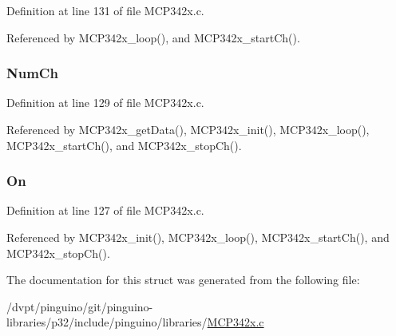 Definition at line 131 of file M\-C\-P342x.\-c.



Referenced by M\-C\-P342x\-\_\-loop(), and M\-C\-P342x\-\_\-start\-Ch().

\hypertarget{structtag_m_c_p342x_a0205dd711b1cc7c32042fe54634bfe84}{
\subsubsection[{Num\-Ch}]{ Num\-Ch}}\label{structtag_m_c_p342x_a0205dd711b1cc7c32042fe54634bfe84}


Definition at line 129 of file M\-C\-P342x.\-c.



Referenced by M\-C\-P342x\-\_\-get\-Data(), M\-C\-P342x\-\_\-init(), M\-C\-P342x\-\_\-loop(), M\-C\-P342x\-\_\-start\-Ch(), and M\-C\-P342x\-\_\-stop\-Ch().

\hypertarget{structtag_m_c_p342x_a2d1f06ea4f608600e241eeded488b0df}{
\subsubsection[{On}]{ On}}\label{structtag_m_c_p342x_a2d1f06ea4f608600e241eeded488b0df}


Definition at line 127 of file M\-C\-P342x.\-c.



Referenced by M\-C\-P342x\-\_\-init(), M\-C\-P342x\-\_\-loop(), M\-C\-P342x\-\_\-start\-Ch(), and M\-C\-P342x\-\_\-stop\-Ch().



The documentation for this struct was generated from the following file\-:\begin{DoxyCompactItemize}
\item 
/dvpt/pinguino/git/pinguino-\/libraries/p32/include/pinguino/libraries/\hyperlink{_m_c_p342x_8c}{M\-C\-P342x.\-c}\end{DoxyCompactItemize}
